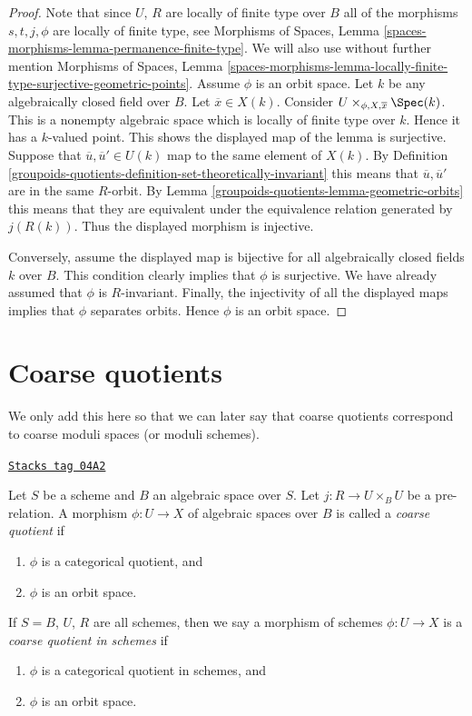 \begin{proof}
Note that since $U$, $R$ are locally of finite type over $B$ all of the
morphisms $s, t, j, \phi$ are locally of finite type, see
Morphisms of Spaces, Lemma \ref{spaces-morphisms-lemma-permanence-finite-type}.
We will also use without further mention
Morphisms of Spaces, Lemma
\ref{spaces-morphisms-lemma-locally-finite-type-surjective-geometric-points}.
Assume $\phi$ is an orbit space. Let $k$ be any algebraically closed
field over $B$. Let $\overline{x} \in X(k)$. Consider
$U \times_{\phi, X, \overline{x}} \Spec(k)$.
This is a nonempty algebraic space
which is locally of finite type over $k$. Hence it has a $k$-valued point.
This shows the displayed map of the lemma is surjective.
Suppose that $\overline{u}, \overline{u}' \in U(k)$ map to the same
element of $X(k)$. By
Definition \ref{groupoids-quotients-definition-set-theoretically-invariant}
this means that $\overline{u}, \overline{u}'$ are in the same
$R$-orbit. By Lemma \ref{groupoids-quotients-lemma-geometric-orbits} this means that
they are equivalent under the equivalence relation generated by
$j(R(k))$. Thus the displayed morphism is injective.

\medskip\noindent
Conversely, assume the displayed map is bijective for all algebraically
closed fields $k$ over $B$. This condition clearly implies that $\phi$
is surjective. We have already assumed that $\phi$ is $R$-invariant.
Finally, the injectivity of all the displayed maps implies that
$\phi$ separates orbits. Hence $\phi$ is an orbit space.
\end{proof}

\section{Coarse quotients}
\label{groupoids-quotients-section-coarse}
We only add this here so that we can later say that coarse quotients
correspond to coarse moduli spaces (or moduli schemes).

\begin{definition}[Coarse]
\label{groupoids-quotients-definition-coarse}
\href{https://stacks.math.columbia.edu/tag/04A2}{\texttt{Stacks tag 04A2}}

Let $S$ be a scheme and $B$ an algebraic space over $S$.
Let $j : R \to U \times_B U$ be a pre-relation.
A morphism $\phi : U \to X$ of algebraic spaces over $B$
is called a {\it coarse quotient} if
\begin{enumerate}
\item $\phi$ is a categorical quotient, and
\item $\phi$ is an orbit space.
\end{enumerate}
If $S = B$, $U$, $R$ are all schemes, then we say a morphism of schemes
$\phi : U \to X$ is a {\it coarse quotient in schemes} if
\begin{enumerate}
\item $\phi$ is a categorical quotient in schemes, and
\item $\phi$ is an orbit space.
\end{enumerate}
\end{definition}

